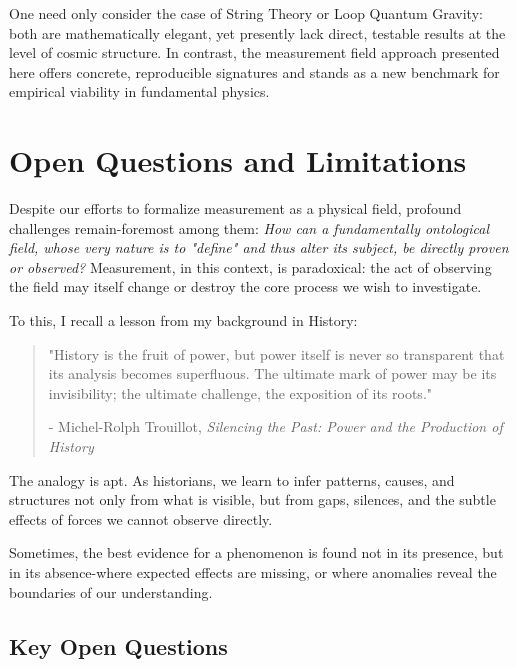One need only consider the case of String Theory or Loop Quantum Gravity: both are mathematically elegant, yet presently lack direct, testable results at the level of cosmic structure. In contrast, the measurement field approach presented here offers concrete, reproducible signatures and stands as a new benchmark for empirical viability in fundamental physics.

\section{Open Questions and Limitations}

Despite our efforts to formalize measurement as a physical field, profound challenges remain-foremost among them: \emph{How can a fundamentally ontological field, whose very nature is to "define" and thus alter its subject, be directly proven or observed?} Measurement, in this context, is paradoxical: the act of observing the field may itself change or destroy the core process we wish to investigate.

To this, I recall a lesson from my background in History:

\begin{quote}
"History is the fruit of power, but power itself is never so transparent that its analysis becomes superfluous. The ultimate mark of power may be its invisibility; the ultimate challenge, the exposition of its roots."
\begin{flushright}
- Michel-Rolph Trouillot, \emph{Silencing the Past: Power and the Production of History}
\end{flushright}
\end{quote}

The analogy is apt. As historians, we learn to infer patterns, causes, and structures not only from what is visible, but from gaps, silences, and the subtle effects of forces we cannot observe directly.

Sometimes, the best evidence for a phenomenon is found not in its presence, but in its absence-where expected effects are missing, or where anomalies reveal the boundaries of our understanding.

\subsection*{Key Open Questions}

